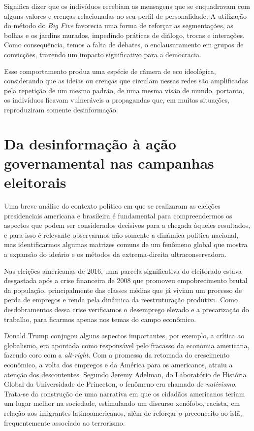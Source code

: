 Significa dizer que os indivíduos recebiam as mensagens que se
enquadravam com alguns valores e crenças relacionadas ao seu perfil de
personalidade. A utilização do método do \textit{Big Five} favorecia uma forma de
reforçar as segmentações, as bolhas e os jardins murados, impedindo
práticas de diálogo, trocas e interações. Como consequência, temos a
falta de debates, o enclausuramento em grupos de convicções, trazendo um
impacto significativo para a democracia.

Esse comportamento produz uma espécie de câmera de eco ideológica,
considerando que as ideias ou crenças que circulam nessas redes são
amplificadas pela repetição de um mesmo padrão, de uma mesma visão de
mundo, portanto, os indivíduos ficavam vulneráveis a propagandas que, em
muitas situações, reproduziram somente desinformação.

\section{Da desinformação à ação governamental nas campanhas eleitorais}

Uma breve análise do contexto político em que se realizaram as eleições
presidenciais americana e brasileira é fundamental para compreendermos
os aspectos que podem ser considerados decisivos para a chegada àqueles
resultados, e para isso é relevante observarmos não somente a dinâmica
política nacional, mas identificarmos algumas matrizes comuns de um
fenômeno global que mostra a expansão do ideário e os métodos da extrema-direita ultraconservadora.

Nas eleições americanas de 2016, uma parcela significativa do eleitorado
estava desgastada após a crise financeira de 2008 que promoveu
empobrecimento brutal da população, principalmente das classes médias
que já viviam um processo de perda de empregos e renda pela dinâmica da
reestruturação produtiva. Como desdobramentos dessa crise verificamos o
desemprego elevado e a precarização do trabalho, para ficarmos apenas nos
temas do campo econômico.

Donald Trump conjugou alguns aspectos importantes, por exemplo, a
crítica ao globalismo, era apontada como responsável pelo fracasso da
economia americana, fazendo coro com a \textit{alt-right}. Com a promessa da
retomada do crescimento econômico, a volta dos empregos e da América
para os americanos, atraiu a atenção dos descontentes. Segundo Jeremy
Adelman, do Laboratório de História Global da Universidade de Princeton,
o fenômeno era chamado de \textit{nativismo}. Trata-se da construção de uma
narrativa em que os cidadãos americanos teriam um lugar melhor na
sociedade, estimulando um discurso xenófobo, racista, em relação aos
imigrantes latinoamericanos, além de reforçar o preconceito ao islã,
frequentemente associado ao terrorismo.

